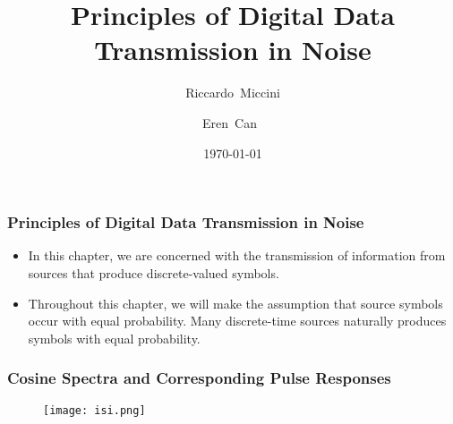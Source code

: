 \documentclass{beamer}
\title{Principles of Digital Data Transmission in Noise}
\subtitle{}
\author[Riccardo \and Eren]{Riccardo~Miccini\inst{1} \and Eren~Can~\inst{1}}
\institute[DTU]
{
	\inst{1}
	Technical University of Denmark\\
	Digital Communication
}
\date{\today}
\begin{document}
	\frame{\titlepage}
	\begin{frame}
		\frametitle{Principles of Digital Data Transmission in Noise}
	\begin{itemize}
	\item In this chapter, we are concerned with the transmission of information from sources that produce discrete-valued symbols.
	\item	 Throughout this chapter, we will make the assumption that source symbols occur with equal probability. Many discrete-time sources naturally produces symbols with equal probability.
	\end{itemize}
	\end{frame}
			\begin{frame}
			\frametitle{Cosine Spectra and Corresponding Pulse Responses}
			\begin{figure}
			\texttt{[image: isi.png]}
			\end{figure}
			\end{frame}
	
\end{document}

